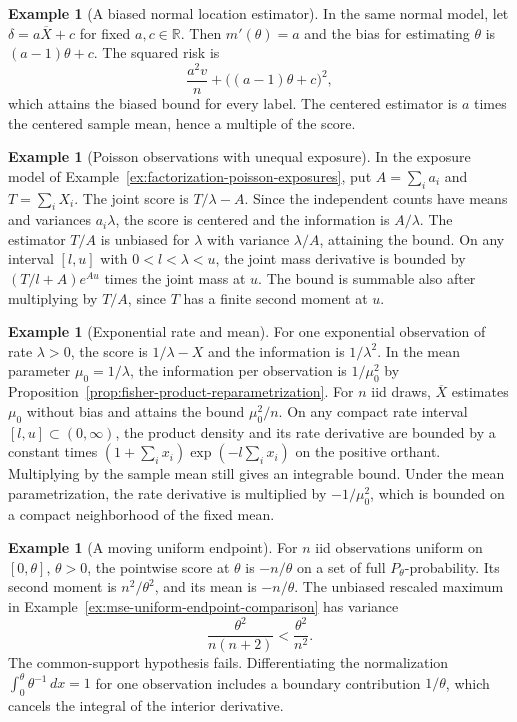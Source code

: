 \documentclass[11pt,oneside]{book}
\theoremstyle{definition}
\newtheorem{example}[theorem]{Example}
\theoremstyle{remark}
\newcommand{\R}{\mathbb R}
\begin{document}
\begin{example}[A biased normal location estimator]
\label{ex:fisher-normal-affine-bias}
In the same normal model, let $\delta=a\overline X+c$ for fixed
$a,c\in\R$. Then $m'(\theta)=a$ and the bias for estimating
$\theta$ is $(a-1)\theta+c$. The squared risk is
\[
\frac{a^2v}{n}+\big((a-1)\theta+c\big)^2,
\]
which attains the biased bound for every label. The centered
estimator is $a$ times the centered sample mean, hence a
multiple of the score.
\end{example}

\begin{example}[Poisson observations with unequal exposure]
\label{ex:fisher-poisson-exposure}
In the exposure model of Example~\ref{ex:factorization-poisson-exposures},
put $A=\sum_i a_i$ and $T=\sum_i X_i$. The joint score is $T/\lambda-A$.
Since the independent counts have means and variances $a_i\lambda$,
the score is centered and the information is $A/\lambda$.
The estimator $T/A$ is unbiased for $\lambda$ with variance
$\lambda/A$, attaining the bound. On any interval $[l,u]$
with $0<l<\lambda<u$, the joint mass derivative is bounded by
$(T/l+A)e^{Au}$ times the joint mass at $u$. The bound is
summable also after multiplying by $T/A$, since $T$ has a
finite second moment at $u$.
\end{example}

\begin{example}[Exponential rate and mean]
\label{ex:fisher-exponential-rate-mean}
For one exponential observation of rate $\lambda>0$, the score
is $1/\lambda-X$ and the information is $1/\lambda^2$. In the
mean parameter $\mu_0=1/\lambda$, the information per observation
is $1/\mu_0^2$ by Proposition~\ref{prop:fisher-product-reparametrization}.
For $n$ iid draws, $\overline X$ estimates $\mu_0$ without bias
and attains the bound $\mu_0^2/n$. On any compact rate interval
$[l,u]\subset(0,\infty)$, the product density and its rate
derivative are bounded by a constant times
$(1+\sum_i x_i)\exp(-l\sum_i x_i)$ on the positive orthant.
Multiplying by the sample mean still gives an integrable bound.
Under the mean parametrization, the rate derivative is multiplied
by $-1/\mu_0^2$, which is bounded on a compact neighborhood of
the fixed mean.
\end{example}

\begin{example}[A moving uniform endpoint]
\label{ex:fisher-uniform-moving-support}
For $n$ iid observations uniform on $[0,\theta]$, $\theta>0$,
the pointwise score at $\theta$ is $-n/\theta$ on a set of full
$P_\theta$-probability. Its second moment is $n^2/\theta^2$,
and its mean is $-n/\theta$. The unbiased rescaled maximum in
Example~\ref{ex:mse-uniform-endpoint-comparison} has variance
\[
\frac{\theta^2}{n(n+2)}<\frac{\theta^2}{n^2}.
\]
The common-support hypothesis fails. Differentiating the
normalization $\int_0^\theta\theta^{-1}\,dx=1$ for one
observation includes a boundary contribution $1/\theta$,
which cancels the integral of the interior derivative.
\end{example}
\end{document}
